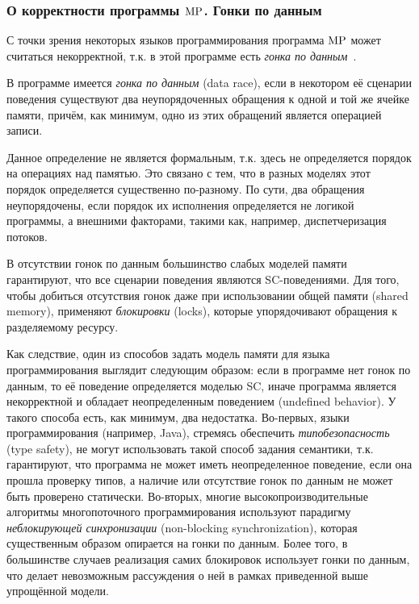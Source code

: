 \subsubsection{О корректности программы ${\rm MP}$. Гонки по данным}
С точки зрения некоторых языков программирования программа ${\rm MP}$ может считаться некорректной,
т.к. в этой программе есть \emph{гонка по данным}~\cite{Unger:ITC95}.
\begin{definition}
  \label{def:datarace}
  В программе имеется \emph{гонка по данным} (data race), если в некотором её сценарии поведения существуют два неупорядоченных
  обращения к одной и той же ячейке памяти, причём, как минимум, одно из этих обращений является операцией записи.
\end{definition}
Данное определение не является формальным, т.к. здесь не определяется порядок на операциях над памятью.
Это связано с тем, что в разных моделях этот порядок определяется существенно по-разному.
По сути, два обращения неупорядочены, если порядок их исполнения определяется не логикой
программы, а внешними факторами, такими как, например, диспетчеризация потоков.

В отсутствии гонок по данным большинство слабых моделей памяти гарантируют, что все сценарии поведения
являются SC-поведениями. Для того, чтобы добиться отсутствия гонок даже при использовании общей памяти (shared memory),
применяют \emph{блокировки} (locks), которые упорядочивают обращения к разделяемому ресурсу.

Как следствие, один из способов задать модель памяти для языка программирования выглядит следующим образом:
если в программе нет гонок по данным, то её поведение определяется моделью SC, иначе программа является некорректной и
обладает неопределенным поведением (undefined behavior).
У такого способа есть, как минимум, два недостатка.
Во-первых, языки программирования  (например, Java), стремясь обеспечить
\emph{типобезопасность} (type safety), не могут использовать такой способ задания семантики,
т.к. гарантируют, что программа не может иметь неопределенное поведение, если она прошла проверку типов, а
наличие или отсутствие гонок по данным не может быть проверено статически.
Во-вторых, многие высокопроизводительные алгоритмы многопоточного программирования используют парадигму
\emph{неблокирующей синхронизации} (non-blocking synchronization), которая существенным образом опирается
на гонки по данным. Более того, в большинстве случаев реализация самих блокировок использует гонки по данным,
что делает невозможным рассуждения о ней в рамках приведенной выше упрощённой модели.

